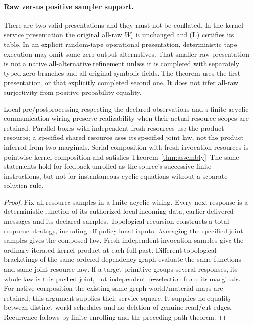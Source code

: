 \documentclass[11pt]{article}
\begin{document}
\paragraph{Raw versus positive sampler support.}
There are two valid presentations and they must not be conflated. In the kernel-service presentation the original all-raw $W_t$ is unchanged and (L) certifies its table. In an explicit random-tape operational presentation, deterministic tape execution may omit some zero output alternatives. That smaller raw presentation is not a native all-alternative refinement unless it is completed with separately typed zero branches and all original symbolic fields. The theorem uses the first presentation, or that explicitly completed second one. It does not infer all-raw surjectivity from positive probability equality.

\begin{proposition}
Local pre/postprocessing respecting the declared observations and a finite acyclic communication wiring preserve realizability when their actual resource scopes are retained. Parallel boxes with independent fresh resources use the product resource; a specified shared resource uses its specified joint law, not the product inferred from two marginals. Serial composition with fresh invocation resources is pointwise kernel composition and satisfies Theorem~\ref{thm:assembly}. The same statements hold for feedback unrolled as the source's successive finite instructions, but not for instantaneous cyclic equations without a separate solution rule.
\end{proposition}
\begin{proof}
Fix all resource samples in a finite acyclic wiring. Every next response is a deterministic function of its authorized local incoming data, earlier delivered messages and its declared samples. Topological recursion constructs a total response strategy, including off-policy local inputs. Averaging the specified joint samples gives the composed law. Fresh independent invocation samples give the ordinary iterated kernel product at each full past. Different topological bracketings of the same ordered dependency graph evaluate the same functions and same joint resource law. If a target primitive groups several responses, its whole law is this pushed joint, not independent re-selection from its marginals. For native composition the existing same-graph world/material maps are retained; this argument supplies their service square. It supplies no equality between distinct world schedules and no deletion of genuine read/cut edges. Recurrence follows by finite unrolling and the preceding path theorem.
\end{proof}
\end{document}

